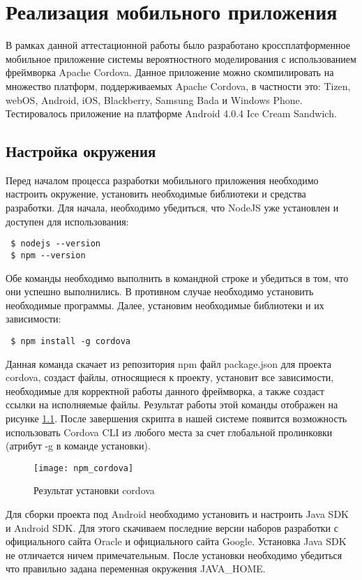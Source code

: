 \chapter{Реализация мобильного приложения}

В рамках данной аттестационной работы было разработано кроссплатформенное мобильное приложение системы вероятностного моделирования с использованием фреймворка Apache Cordova. Данное приложение можно скомпилировать на множество платформ, поддерживаемых Apache Cordova, в частности это: Tizen, webOS, Android, iOS, Blackberry, Samsung Bada и Windows Phone. Тестировалось приложение на платформе Android 4.0.4 Ice Cream Sandwich.

\section{Настройка окружения}
Перед началом процесса разработки мобильного приложения необходимо настроить окружение, установить необходимые библиотеки и средства разработки. Для начала, необходимо убедиться, что NodeJS уже установлен и доступен для использования:
\begin{lstlisting}
 $ nodejs --version
 $ npm --version
\end{lstlisting}

Обе команды необходимо выполнить в командной строке и убедиться в том, что они успешно выполнились. В противном случае необходимо установить необходимые программы. Далее, установим необходимые библиотеки и их зависимости:
\begin{lstlisting}
 $ npm install -g cordova
\end{lstlisting}

Данная команда скачает из репозитория npm файл package.json для проекта cordova, создаст файлы, относящиеся к проекту, установит все зависимости, необходимые для корректной работы данного фреймворка, а также создаст ссылки на исполняемые файлы. Результат работы этой команды отображен на рисунке \ref{npm_cordova}. После завершения скрипта в нашей системе появится возможность использовать Cordova CLI из любого места за счет глобальной пролинковки (атрибут -g в команде установки).

\begin{figure}[ht]
\center\texttt{[image: npm\_cordova]}
\caption{Результат установки cordova}\label{npm_cordova}
\end{figure}

Для сборки проекта под Android необходимо установить и настроить Java SDK и Android SDK. Для этого скачиваем последние версии наборов разработки с официального сайта Oracle\cite{cordova:java_sdk} и официального сайта Google\cite{cordova:android_sdk}. Установка Java SDK не отличается ничем примечательным. После установки необходимо убедиться что правильно задана переменная окружения JAVA\_HOME.

